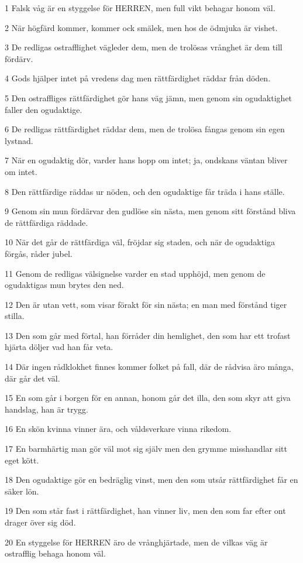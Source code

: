 \par 1 Falsk våg är en styggelse för HERREN, men full vikt behagar honom väl.
\par 2 När högfärd kommer, kommer ock smälek, men hos de ödmjuka är vishet.
\par 3 De redligas ostrafflighet vägleder dem, men de trolösas vrånghet är dem till fördärv.
\par 4 Gods hjälper intet på vredens dag men rättfärdighet räddar från döden.
\par 5 Den ostraffliges rättfärdighet gör hans väg jämn, men genom sin ogudaktighet faller den ogudaktige.
\par 6 De redligas rättfärdighet räddar dem, men de trolösa fångas genom sin egen lystnad.
\par 7 När en ogudaktig dör, varder hans hopp om intet; ja, ondskans väntan bliver om intet.
\par 8 Den rättfärdige räddas ur nöden, och den ogudaktige får träda i hans ställe.
\par 9 Genom sin mun fördärvar den gudlöse sin nästa, men genom sitt förstånd bliva de rättfärdiga räddade.
\par 10 När det går de rättfärdiga väl, fröjdar sig staden, och när de ogudaktiga förgås, råder jubel.
\par 11 Genom de redligas välsignelse varder en stad upphöjd, men genom de ogudaktigas mun brytes den ned.
\par 12 Den är utan vett, som visar förakt för sin nästa; en man med förstånd tiger stilla.
\par 13 Den som går med förtal, han förråder din hemlighet, den som har ett trofast hjärta döljer vad han får veta.
\par 14 Där ingen rådklokhet finnes kommer folket på fall, där de rådvisa äro många, där går det väl.
\par 15 En som går i borgen för en annan, honom går det illa, den som skyr att giva handslag, han är trygg.
\par 16 En skön kvinna vinner ära, och våldsverkare vinna rikedom.
\par 17 En barmhärtig man gör väl mot sig själv men den grymme misshandlar sitt eget kött.
\par 18 Den ogudaktige gör en bedräglig vinst, men den som utsår rättfärdighet får en säker lön.
\par 19 Den som står fast i rättfärdighet, han vinner liv, men den som far efter ont drager över sig död.
\par 20 En styggelse för HERREN äro de vrånghjärtade, men de vilkas väg är ostrafflig behaga honom väl.
